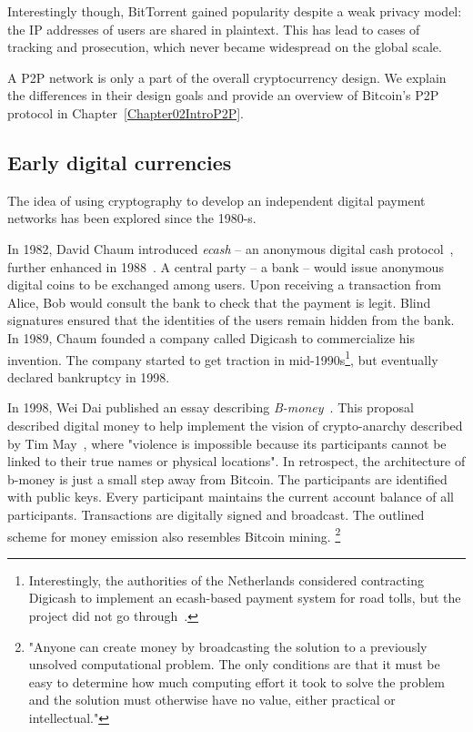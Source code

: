 Interestingly though, BitTorrent gained popularity despite a weak privacy model: the IP addresses of users are shared in plaintext.
This has lead to cases of tracking and prosecution, which never became widespread on the global scale.

A P2P network is only a part of the overall cryptocurrency design.
We explain the differences in their design goals and provide an overview of Bitcoin's P2P protocol in Chapter~\ref{Chapter02IntroP2P}.


\subsection{Early digital currencies}

The idea of using cryptography to develop an independent digital payment networks has been explored since the 1980-s.

In 1982, David Chaum introduced \textit{ecash} -- an anonymous digital cash protocol~\cite{Chaum1982}, further enhanced in 1988~\cite{Chaum1988}.
A central party -- a bank -- would issue anonymous digital coins to be exchanged among users.
Upon receiving a transaction from Alice, Bob would consult the bank to check that the payment is legit.
Blind signatures ensured that the identities of the users remain hidden from the bank.
In 1989, Chaum founded a company called Digicash to commercialize his invention.
The company started to get traction in mid-1990s\footnote{Interestingly, the authorities of the Netherlands considered contracting Digicash to implement an ecash-based payment system for road tolls, but the project did not go through~\cite{Chaum2019}.}, but eventually declared bankruptcy in 1998.

In 1998, Wei Dai published an essay describing \textit{B-money}~\cite{Dai1998}.
This proposal described digital money to help implement the vision of crypto-anarchy described by Tim May~\cite{May1988}, where "violence is impossible because its participants cannot be linked to their true names or physical locations".
In retrospect, the architecture of b-money is just a small step away from Bitcoin.
The participants are identified with public keys.
Every participant maintains the current account balance of all participants.
Transactions are digitally signed and broadcast.
The outlined scheme for money emission also resembles Bitcoin mining.
\footnote{"Anyone can create money by broadcasting the solution to a previously unsolved computational problem. The only conditions are that it must be easy to determine how much computing effort it took to solve the problem and the solution must otherwise have no value, either practical or intellectual."}

